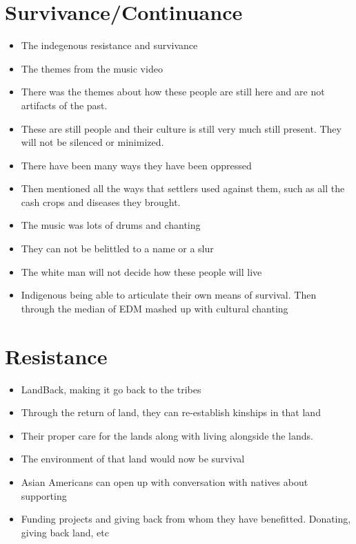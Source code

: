 \documentclass{article}
\begin{document}
\section*{Survivance/Continuance}
\begin{itemize}
  \item The indegenous resistance and survivance
  \item The themes from the music video 
  \item There was the themes about how these
    people are still here and are not artifacts of the past.
  \item These are still people and their culture is still very much
    still present. They will not be silenced or minimized.
  \item There have been many ways they have been oppressed
  \item Then mentioned all the ways that settlers used against them, such as 
    all the cash crops and diseases they brought.
  \item The music was lots of drums and chanting
  \item They can not be belittled to a name or a slur
  \item The white man will not decide how these people will live
  \item Indigenous being able to articulate their own
    means of survival. Then through the median of EDM mashed up with cultural chanting
\end{itemize}

\section*{Resistance}
\begin{itemize}
  \item LandBack, making it go back to the tribes
  \item Through the return of land, they can re-establish kinships in that land
  \item Their proper care for the lands
    along with living alongside the lands.
  \item The environment of that land would now be survival
  \item Asian Americans can open up with conversation with natives about supporting
  \item Funding projects and giving back from whom they have benefitted. Donating,
    giving back land, etc
\end{itemize}
\end{document}
